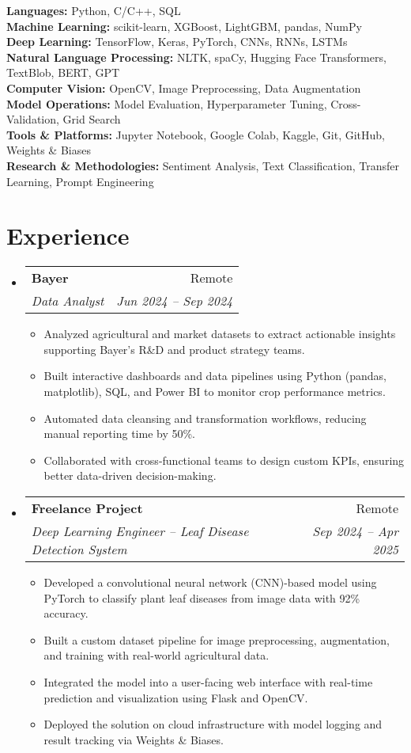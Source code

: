 \documentclass[a4paper,11pt]{article}
\makeatletter
\newcommand{\resumeItem}[1]{
  \item\small{
    {#1 \vspace{-2pt}}
  }
}
\newcommand{\resumeSubheading}[4]{
  \vspace{-2pt}\item
    \begin{tabular*}{0.97\textwidth}[t]{l@{\extracolsep{\fill}}r}
      \textbf{#1} & #2 \\
      \textit{\small#3} & \textit{\small #4} \\
    \end{tabular*}\vspace{-7pt}
}
\newcommand{\resumeSubHeadingListStart}{\begin{itemize}[leftmargin=0.15in, label={}]}
\newcommand{\resumeSubHeadingListEnd}{\end{itemize}}
\newcommand{\resumeItemListStart}{\begin{itemize}}
\newcommand{\resumeItemListEnd}{\end{itemize}\vspace{-5pt}}
\makeatother
\begin{document}
\resumeSubHeadingListStart
\small{\item{
    \textbf{Languages:} Python, C/C++, SQL \\ \vspace{3pt}
    \textbf{Machine Learning:} scikit-learn, XGBoost, LightGBM, pandas, NumPy \\ \vspace{3pt}
    \textbf{Deep Learning:} TensorFlow, Keras, PyTorch, CNNs, RNNs, LSTMs \\ \vspace{3pt}
    \textbf{Natural Language Processing:} NLTK, spaCy, Hugging Face Transformers, TextBlob, BERT, GPT \\ \vspace{3pt}
    \textbf{Computer Vision:} OpenCV, Image Preprocessing, Data Augmentation \\ \vspace{3pt}
    \textbf{Model Operations:} Model Evaluation, Hyperparameter Tuning, Cross-Validation, Grid Search \\ \vspace{3pt}
    \textbf{Tools \& Platforms:} Jupyter Notebook, Google Colab, Kaggle, Git, GitHub, Weights & Biases \\ \vspace{3pt}
    \textbf{Research & Methodologies:} Sentiment Analysis, Text Classification, Transfer Learning, Prompt Engineering
}}
\resumeSubHeadingListEnd


\section{Experience}
\vspace{3pt}
\resumeSubHeadingListStart
\resumeSubheading
{Bayer}{Remote}
{Data Analyst}{Jun 2024 -- Sep 2024}
\resumeItemListStart
\resumeItem{
Analyzed agricultural and market datasets to extract actionable insights supporting Bayer’s R\&D and product strategy teams.}
\resumeItem{
Built interactive dashboards and data pipelines using Python (pandas, matplotlib), SQL, and Power BI to monitor crop performance metrics.}
\resumeItem{
Automated data cleansing and transformation workflows, reducing manual reporting time by 50\%.}
\resumeItem{
Collaborated with cross-functional teams to design custom KPIs, ensuring better data-driven decision-making.}
\resumeItemListEnd
\resumeSubHeadingListEnd

\resumeSubHeadingListStart
\resumeSubheading
{Freelance Project}{Remote}
{Deep Learning Engineer – Leaf Disease Detection System}{Sep 2024 -- Apr 2025}
\resumeItemListStart
\resumeItem{
Developed a convolutional neural network (CNN)-based model using PyTorch to classify plant leaf diseases from image data with 92\% accuracy.}
\resumeItem{
Built a custom dataset pipeline for image preprocessing, augmentation, and training with real-world agricultural data.}
\resumeItem{
Integrated the model into a user-facing web interface with real-time prediction and visualization using Flask and OpenCV.}
\resumeItem{
Deployed the solution on cloud infrastructure with model logging and result tracking via Weights \& Biases.}
\resumeItemListEnd
\resumeSubHeadingListEnd
\end{document}
